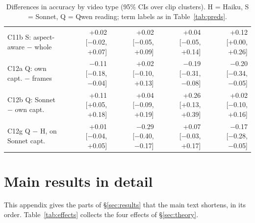 \documentclass[11pt]{article}
\begin{document}
\begin{table}[t]
\begin{tabular}{@{}lrrrr@{}}
C11b S: aspect-aware − whole & +0.02 [−0.02, +0.07] & +0.02 [−0.05, +0.09] & +0.04 [−0.05, +0.14] & +0.12 [+0.00, +0.26] \\
C12a Q: own capt. − frames & −0.11 [−0.18, −0.04] & +0.02 [−0.10, +0.13] & −0.19 [−0.31, −0.08] & −0.20 [−0.34, −0.05] \\
C12b Q: Sonnet − own capt. & +0.11 [+0.05, +0.18] & +0.04 [−0.09, +0.19] & +0.26 [+0.13, +0.39] & +0.02 [−0.10, +0.16] \\
C12g Q − H, on Sonnet capt. & +0.01 [−0.04, +0.05] & −0.29 [−0.40, −0.17] & +0.07 [−0.03, +0.17] & −0.17 [−0.28, −0.05] \\
\bottomrule
\end{tabular}
\caption{Differences in accuracy by video type (95\% CIs over clip clusters). H = Haiku, S = Sonnet, Q = Qwen reading; term labels as in Table~\ref{tab:preds}.}
\label{tab:bytype}
\end{table}

\section{Main results in detail}
\label{app:detail}

This appendix gives the parts of \S\ref{sec:results} that the main text shortens, in its order. Table~\ref{tab:effects} collects the four effects of \S\ref{sec:theory}.

\begin{table}[t]
\centering
\footnotesize
{}
\caption{The four effects, with Haiku reading. Accuracy differences on 297 questions, 95\% paired bootstrap CIs (the modality cell is the pre-registered P2, with its 98.33\% CI). In the Gemini chain the terms add up along two paths (\S\ref{sec:theory}).}
\label{tab:effects}
\end{table}
\end{document}

